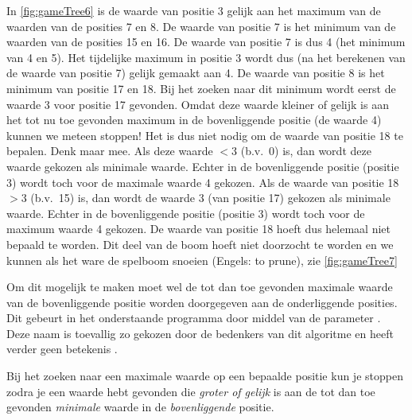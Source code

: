\begin{cpplstShortInline}
In \cref{fig:gameTree6} is de waarde van positie 3 gelijk aan het maximum van de waarden van de posities 7 en 8.
De waarde van positie 7 is het minimum van de waarden van de posities 15 en 16.
De waarde van positie 7 is dus 4 (het minimum van 4 en 5).
Het tijdelijke maximum in positie 3 wordt dus (na het berekenen van de waarde van positie 7) gelijk gemaakt aan 4.
De waarde van positie 8 is het minimum van positie 17 en 18.
Bij het zoeken naar dit minimum wordt eerst de waarde 3 voor positie 17 gevonden.
Omdat deze waarde kleiner of gelijk is aan het tot nu toe gevonden maximum in de bovenliggende positie (de waarde 4) kunnen we meteen stoppen!
Het is dus niet nodig om de waarde van positie 18 te bepalen.
Denk maar mee.
Als deze waarde $<$3 (b.v.\ 0) is, dan wordt deze waarde gekozen als minimale waarde.
Echter in de bovenliggende positie (positie 3) wordt toch voor de maximale waarde 4 gekozen.
Als de waarde van positie 18 $>$3 (b.v.\ 15) is, dan wordt de waarde 3 (van positie 17) gekozen als minimale waarde.
Echter in de bovenliggende positie (positie 3) wordt toch voor de maximum waarde 4 gekozen.
De waarde van positie 18 hoeft dus helemaal niet bepaald te worden.
Dit deel van de boom hoeft niet doorzocht te worden en we kunnen als het ware de spelboom snoeien (Engels: to prune), zie \cref{fig:gameTree7}


Om dit mogelijk te maken moet wel de tot dan toe gevonden maximale waarde van de bovenliggende positie worden doorgegeven aan de onderliggende posities.
Dit gebeurt in het onderstaande programma  door middel van de parameter .
Deze naam is toevallig zo gekozen door de bedenkers van dit algoritme en heeft verder geen betekenis \cite{Knuth1975}.


Bij het zoeken naar een maximale waarde op een bepaalde positie kun je stoppen zodra je een waarde hebt gevonden die \emph{groter of gelijk} is aan de tot dan toe gevonden \emph{minimale} waarde in de \emph{bovenliggende} positie.


\end{cpplstShortInline}
